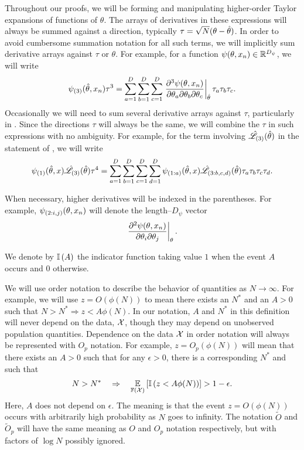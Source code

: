 

Throughout our proofs, we will be forming and manipulating higher-order
Taylor expansions of functions of $\theta$.  The arrays of derivatives
in these expressions will always be summed against a direction, typically
$\tau = \sqrt{N}(\theta - \hat\theta)$.  In order to avoid cumbersome
summation notation for all such terms, we will implicitly sum derivative arrays
against $\tau$ or $\theta$.  For example, for
a function $\psi(\theta, x_n) \in \mathbb{R}^{D_\psi}$, we will write
%
\begin{align*}
\psi_{(3)}(\hat\theta, x_n)\tau^3 =
\sum_{a=1}^D \sum_{b=1}^D \sum_{c=1}^D
    \left.\frac{\partial^3 \psi(\theta, x_n)}{\partial\theta_{a} \partial\theta_{b} \partial\theta_{c}}\right\vert_{\hat\theta} \tau_{a} \tau_{b} \tau_{c}.
\end{align*}
%
Occasionally we will need to sum several derivative arrays against $\tau$,
particularly in .  Since the directions $\tau$ will always be
the same, we will combine the $\tau$ in such expressions with no ambiguity. For
example, for the term involving $\hat{\mathscr{L}}_{(3)}(\hat\theta)$ in the statement of
, we will write
%
\begin{align*}
%
\psigrad{1}(\thetahat, \x) \likhatk{3}(\thetahat) \tau^4 =
\sum_{a=1}^{D} \sum_{b=1}^{D} \sum_{c=1}^{D} \sum_{d=1}^{D}
    \psigrad{1:a}(\thetahat, \x) \likhatk{3:b,c,d}(\thetahat)
    \tau_a \tau_b \tau_c \tau_d.
%
\end{align*}
%

When necessary, higher
derivatives will be indexed in the parentheses.  For example,
$\psi_{(2:i,j)}(\theta, x_n)$ will denote the length--$D_\psi$ vector
%
\begin{align*}
%
\fracat{\partial^2 \psi(\theta, \x_n)}
    {\partial\theta_i \partial\theta_j}{\theta}.
%
\end{align*}
%

We denote by $\mathbb{I}\left(A\right)$ the indicator function taking value $1$ when the
event $A$ occurs and $0$ otherwise.

We will use order notation to describe the behavior of quantities as $N
\rightarrow \infty$.  For example, we will use $z = O(\phi(N))$ to mean there
exists an $N^*$ and an $A > 0$ such that $N > N^* \Rightarrow z < A \phi(N)$. In
our notation, $A$ and $N^*$ in this definition will never depend on the data,
${\mathcal{X}}$, though they may depend on unobserved population quantities.
%
Dependence on the data ${\mathcal{X}}$ in order notation will always be represented with
$O_p$ notation.  For example, $z = O_p(\phi(N))$ will mean that there exists an
$A > 0$ such that for any $\epsilon > 0$, there is a corresponding $N^*$ and
such that
%
\begin{align*}
%
N > N^* \quad\Rightarrow\quad
    \expect{\xfdist}{\ind{z < A \phi(N)}} > 1 - \epsilon.
%
\end{align*}
%
Here, $A$ does not depend on $\epsilon$.  The meaning is that the event $z =
O(\phi(N))$ occurs with arbitrarily high probability as $N$ goes to infinity.
The notation $\tilde{O}$ and $\tilde{O}_p$ will have the same meaning as $O$ and
$O_p$ notation respectively, but with factors of $\log N$ possibly ignored.
